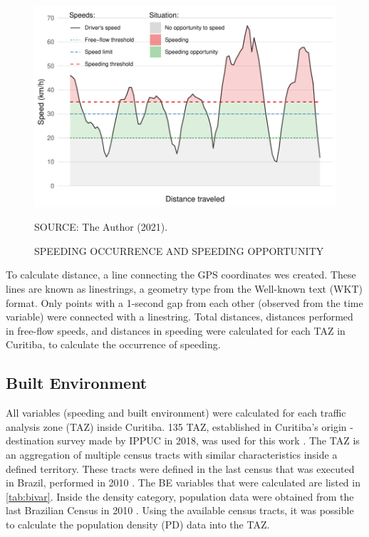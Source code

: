 \begin{figure}[!htbp]
    \centering\footnotesize
    \captionsetup{font=footnotesize}
    \caption{SPEEDING OCCURRENCE AND SPEEDING OPPORTUNITY}
    \includegraphics{fig/spd_occur.pdf}
    \label{fig:spd_occur}
    \par SOURCE: The Author (2021).
\end{figure}


To calculate distance, a line connecting the GPS coordinates wes created. These lines are known as linestrings, a geometry type from the Well-known text (WKT) format. Only points with a 1-second gap from each other (observed from the time variable) were connected with a linestring. Total distances, distances performed in free-flow speeds, and distances in speeding were calculated for each TAZ in Curitiba, to calculate the occurrence of speeding. 

\subsection{Built Environment} \label{sub:be}




All variables (speeding and built environment) were calculated for each traffic analysis zone (TAZ) inside Curitiba. 135 TAZ, established in Curitiba's origin - destination survey made by IPPUC in 2018, was used for this work \cite{IPPUC2018b}. The TAZ is an aggregation of multiple census tracts with similar characteristics inside a defined territory. These tracts were defined in the last census that was executed in Brazil, performed in 2010 \cite{IBGE2010}. The BE variables that were calculated are listed in \autoref{tab:bivar}. Inside the density category, population data were obtained from the last Brazilian Census in 2010 \cite{IBGE2010}. Using the available census tracts, it was possible to calculate the population density (PD) data into the TAZ. 

